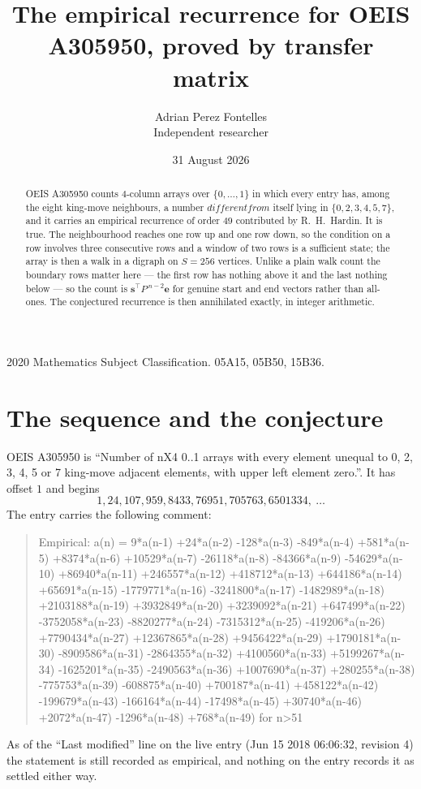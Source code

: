 \documentclass[11pt,a4paper]{article}
\title{The empirical recurrence for OEIS A305950, proved by transfer matrix}
\author{Adrian Perez Fontelles\\ \small Independent researcher}
\date{31 August 2026}
\theoremstyle{plain}
\theoremstyle{definition}
\begin{document}
\maketitle

\begin{abstract}
OEIS A305950 counts $4$-column arrays over $\{0,\dots,1\}$ in which every entry has,
among the eight king-move neighbours, a number $different from$ itself lying in $\{0,2,3,4,5,7\}$, and it carries an empirical
recurrence of order $49$ contributed by R.~H.~Hardin. It is true. The neighbourhood
reaches one row up and one row down, so the condition on a row involves three consecutive
rows and a window of two rows is a sufficient state; the array is then a walk in a digraph
on $S=256$ vertices. Unlike a plain walk count the boundary rows matter here --- the first
row has nothing above it and the last nothing below --- so the count is
$\mathbf{s}^{\!\top}P^{\,n-2}\mathbf{e}$ for genuine start and end vectors rather than
all-ones. The conjectured recurrence is then annihilated exactly, in integer arithmetic.
\end{abstract}

\noindent\small 2020 Mathematics Subject Classification. 05A15, 05B50, 15B36.\normalsize

\section{The sequence and the conjecture}

OEIS A305950 is ``Number of nX4 0..1 arrays with every element unequal to 0, 2, 3, 4, 5 or 7 king-move adjacent elements, with upper left element zero.''. It has offset
$1$ and begins
\[
1, 24, 107, 959, 8433, 76951, 705763, 6501334,\ \dots
\]
The entry carries the following comment:
\begin{quote}\small
Empirical: a(n) = 9*a(n-1) +24*a(n-2) -128*a(n-3) -849*a(n-4) +581*a(n-5) +8374*a(n-6) +10529*a(n-7) -26118*a(n-8) -84366*a(n-9) -54629*a(n-10) +86940*a(n-11) +246557*a(n-12) +418712*a(n-13) +644186*a(n-14) +65691*a(n-15) -1779771*a(n-16) -3241800*a(n-17) -1482989*a(n-18) +2103188*a(n-19) +3932849*a(n-20) +3239092*a(n-21) +647499*a(n-22) -3752058*a(n-23) -8820277*a(n-24) -7315312*a(n-25) -419206*a(n-26) +7790434*a(n-27) +12367865*a(n-28) +9456422*a(n-29) +1790181*a(n-30) -8909586*a(n-31) -2864355*a(n-32) +4100560*a(n-33) +5199267*a(n-34) -1625201*a(n-35) -2490563*a(n-36) +1007690*a(n-37) +280255*a(n-38) -775753*a(n-39) -608875*a(n-40) +700187*a(n-41) +458122*a(n-42) -199679*a(n-43) -166164*a(n-44) -17498*a(n-45) +30740*a(n-46) +2072*a(n-47) -1296*a(n-48) +768*a(n-49) for n>51
\end{quote}
As of the ``Last modified'' line on the live entry (Jun 15 2018 06:06:32, revision
4) the statement is still recorded as empirical, and nothing on the entry
records it as settled either way.
\end{document}
